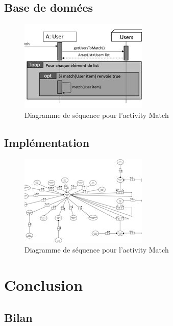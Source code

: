 \documentclass{beamer}
\begin{document}
\subsection{Base de données}

\begin{frame}
  \begin{figure} 
  	\centering 
  	\includegraphics[scale=0.8]{pictures/sequence_match.jpg} 
  	\caption{Diagramme de séquence pour l'activity Match} 
  	\label{fig:my_label} 
  \end{figure}
\end{frame}



\subsection{Implémentation}
\begin{frame}
  \begin{figure} 
	\centering 
	\includegraphics[scale=0.8]{pictures/schema_database.jpg} 
	\caption{Diagramme de séquence pour l'activity Match} 
	\label{fig:my_label} 
  \end{figure}
\end{frame}

\section{Conclusion}

\subsection{Bilan}
\end{document}
